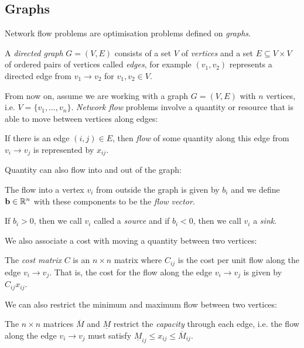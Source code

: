 \documentclass[../main.tex]{subfiles}
\begin{document}
\subsection{Graphs}
Network flow problems are optimisation problems defined on \textit{graphs}.
\begin{definition}
  A \textit{directed graph} $G = (V, E)$ consists of a set $V$ of \textit{vertices} and a set $E \subseteq V \times V$ of ordered pairs of vertices called \textit{edges}, for example $(v_1, v_2)$ represents a directed edge from $v_1 \to v_2$ for $v_1, v_2 \in V$.
\end{definition}
From now on, assume we are working with a graph $G = (V, E)$ with $n$ vertices, i.e. $V = \{v_1, \ldots, v_n\}$.
\textit{Network flow} problems involve a quantity or resource that is able to move between vertices along edges:
\begin{definition}[Flow]
  If there is an edge $(i, j) \in E$, then \textit{flow} of some quantity along this edge from $v_i \to v_j$ is represented by $x_{i j}$.
\end{definition}
Quantity can also flow into and out of the graph:
\begin{definition}
  The flow into a vertex $v_i$ from outside the graph is given by $b_i$ and we define $\mathbf{\bm{b}} \in \mathbb{R}^{n}$ with these components to be the \textit{flow vector}.

  If $b_i > 0$, then we call $v_i$ called a \textit{source} and if $b_i < 0$, then we call $v_i$ a \textit{sink}.
\end{definition}
We also associate a cost with moving a quantity between two vertices:
\begin{definition}
  The \textit{cost matrix} $C$ is an $n \times n$ matrix where $C_{i j}$ is the cost per unit flow along the edge $v_i \to v_j$.
  That is, the cost for the flow along the edge $v_i \to v_j$ is given by $C_{i j} x_{i j}$.
\end{definition}
We can also restrict the minimum and maximum flow between two vertices:
\begin{definition}
  The $n \times n$ matrices $\overline{M}$ and $\underline{M}$ restrict the \textit{capacity} through each edge, i.e. the flow along the edge $v_i \to v_j$ must satisfy $\underline{M}_{i j} \leq x_{i j} \leq \overline{M}_{i j}$.
\end{definition}
\end{document}
